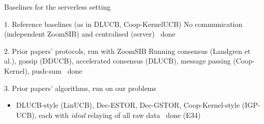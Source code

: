 \documentclass[11pt]{beamer}
\newcommand{\yes}{\textcolor{green!45!black}{\ding{51}}}
\begin{document}
\begin{frame}{Baselines for the serverless setting}
\small
\begin{block}{1. Reference baselines (as in DLUCB, Coop-KernelUCB)}
No communication (independent ZoomSIB) \quad and \quad centralised (server) \hfill \yes\ done
\end{block}
\begin{block}{2. Prior papers' protocols, run with ZoomSIB}
Running consensus (Landgren et al.), gossip (DDUCB), accelerated consensus (DLUCB), message passing (Coop-Kernel), push-sum \hfill \yes\ done
\end{block}
\begin{block}{3. Prior papers' algorithms, run on our problems}
\begin{itemize}
\item DLUCB-style (LinUCB), Dec-ESTOR, Dec-GSTOR, Coop-Kernel-style (IGP-UCB), each with \emph{ideal} relaying of all raw data \hfill \yes\ done (E34)
\end{itemize}
\end{block}
\end{frame}
\end{document}
